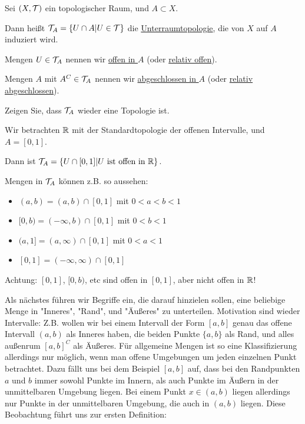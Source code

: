 \begin{definition}[Unterraum]
    Sei $(X, \mathcal{T})$ ein topologischer Raum, und $A \subset X$.

    Dann heißt $\mathcal{T}_A = \{U \cap A | U \in \mathcal{T}\}$ die \underline{Unterraumtopologie}, die von $X$ auf $A$ induziert wird.

    Mengen $U \in \mathcal{T}_A$ nennen wir \underline{offen in $A$} (oder \underline{relativ offen}).
    
    Mengen $A$ mit $A^C \in \mathcal{T}_A$ nennen wir \underline{abgeschlossen in $A$} (oder \underline{relativ abgeschlossen}).
\end{definition}

\begin{exercise}
    Zeigen Sie, dass $\mathcal{T}_A$ wieder eine Topologie ist.
\end{exercise}

\begin{example}
    Wir betrachten $\mathbb{R}$ mit der Standardtopologie der offenen Intervalle, und $A = [0, 1]$.

    Dann ist $\mathcal{T}_A = \{U \cap [0, 1] | U \text{ ist offen in } \mathbb{R} \}$.

    Mengen in $\mathcal{T}_A$ können z.B. so aussehen:
    \begin{itemize}[label=]
        \item $(a, b) = (a, b) \cap [0, 1]$ mit $0 < a < b < 1$
        \item $[0, b) = (-\infty, b) \cap [0, 1]$ mit $0 < b < 1$
        \item $(a, 1] = (a, \infty) \cap [0, 1]$ mit $0 < a < 1$
        \item $[0, 1] = (-\infty, \infty) \cap [0,1]$
    \end{itemize}
    Achtung: $[0, 1]$, $[0, b)$, etc sind offen in $[0, 1]$, aber nicht offen in $\mathbb{R}$!
\end{example}

Als nächstes führen wir Begriffe ein, die darauf hinzielen sollen, eine beliebige Menge in "Inneres", "Rand", und "Äußeres" zu unterteilen. Motivation sind wieder Intervalle: Z.B. wollen wir bei einem Intervall der Form $[a, b]$ genau das offene Intervall $(a, b)$ als Inneres haben, die beiden Punkte $\{a, b\}$ als Rand, und alles außenrum $[a, b]^C$ als Äußeres. Für allgemeine Mengen ist so eine Klassifizierung allerdings nur möglich, wenn man offene Umgebungen um jeden einzelnen Punkt betrachtet. Dazu fällt uns bei dem Beispiel $[a, b]$ auf, dass bei den Randpunkten $a$ und $b$ immer sowohl Punkte im Innern, als auch Punkte im Äußern in der unmittelbaren Umgebung liegen. Bei einem Punkt $x \in (a, b)$ liegen allerdings nur Punkte in der unmittelbaren Umgebung, die auch in $(a, b)$ liegen. Diese Beobachtung führt uns zur ersten Definition:

